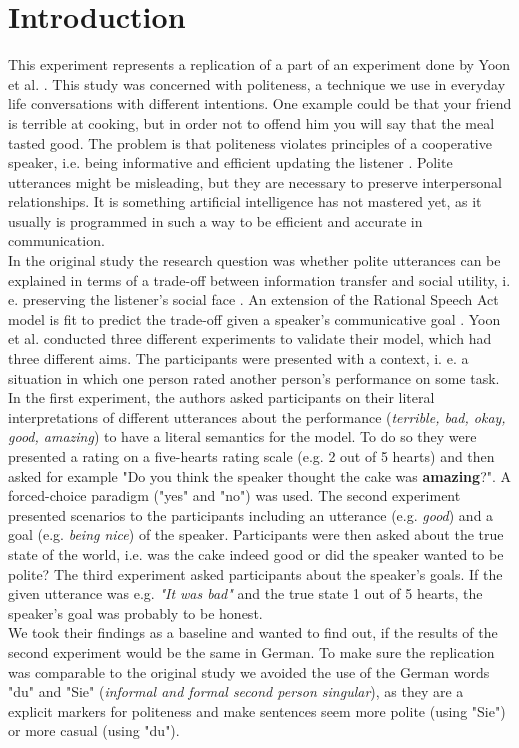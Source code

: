 \documentclass[a4paper,11pt]{article}
\begin{document}
\section{Introduction}
This experiment represents a replication of a part of an experiment done by Yoon et al. \cite{yoon2016talking}. This study was concerned with politeness, a technique we use in everyday life conversations with different intentions. One example could be that your friend is terrible at cooking, but in order not to offend him you will say that the meal tasted good. The problem is that politeness violates principles of a cooperative speaker, i.e. being informative and efficient updating the listener \cite{grice1975logic}. Polite utterances might be misleading, but they are necessary to preserve interpersonal relationships. It is something artificial intelligence has not mastered yet, as it usually is programmed in such a way to be efficient and accurate in communication. \\ In the original study the research question was whether polite utterances can be explained in terms of a trade-off between information transfer and social utility, i. e. preserving the listener's social face \cite{brown1987politeness} . An extension of the Rational Speech Act model is fit to predict the trade-off given a speaker's communicative goal \cite{frank2012predicting}.  Yoon et al. \cite{yoon2016talking} conducted three different experiments to validate their model, which had three different aims. The participants were presented with a context, i. e. a situation in which one person rated another person's performance on some task. In the first experiment, the authors asked participants on their literal interpretations of different utterances about the performance (\textit{terrible, bad, okay, good, amazing}) to have a literal semantics for the model. To do so they were presented a rating on a five-hearts rating scale (e.g. 2 out of 5 hearts) and then asked for example "Do you think the speaker thought the cake was \textbf{amazing}?". A forced-choice paradigm ("yes" and "no") was used. The second experiment presented scenarios to the participants including an utterance (e.g. \textit{good}) and a goal (e.g. \textit{being nice}) of the speaker. Participants were then asked about the true state of the world, i.e. was the cake indeed good or did the speaker wanted to be polite? The third experiment asked participants about the speaker's goals. If the given utterance was e.g. \textit{"It was bad"} and the true state 1 out of 5 hearts, the speaker's goal was probably to be honest. \\ We took their findings as a baseline and wanted to find out, if the results of the second experiment would be the same in German. To make sure the replication was comparable to the original study we avoided the use of the German words "du" and "Sie" (\textit{informal and formal second person singular}), as they are a explicit markers for politeness and make sentences seem more polite (using "Sie") or more casual (using "du"). 
\end{document}
